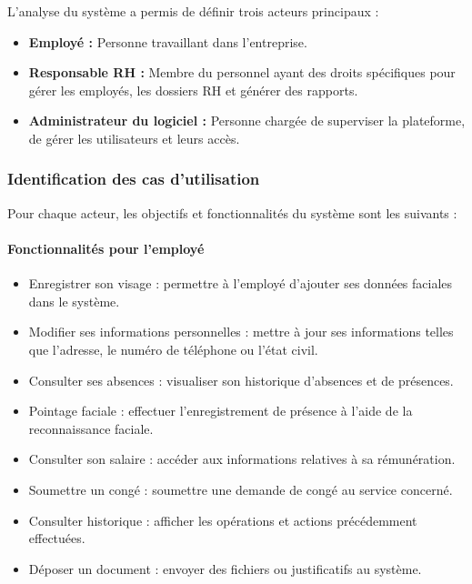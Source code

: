 L'analyse du système a permis de définir trois acteurs principaux :

\begin{itemize}
  \item \textbf{Employé :} Personne travaillant dans l'entreprise.
  \item \textbf{Responsable RH :} Membre du personnel ayant des droits spécifiques pour
        gérer les employés, les dossiers RH et générer des rapports.
  \item \textbf{Administrateur du logiciel :} Personne chargée de superviser la plateforme,
        de gérer les utilisateurs et leurs accès.
\end{itemize}

\subsubsection{Identification des cas d'utilisation}

Pour chaque acteur, les objectifs et fonctionnalités du système sont les suivants :

\paragraph{Fonctionnalités pour l'employé}

\begin{itemize}
  \item Enregistrer son visage : permettre à l'employé d'ajouter ses données faciales dans le système.
  \item Modifier ses informations personnelles : mettre à jour ses informations telles que l'adresse, le numéro de téléphone ou l'état civil.
  \item Consulter ses absences : visualiser son historique d'absences et de présences.
  \item Pointage faciale : effectuer l'enregistrement de présence à l'aide de la reconnaissance faciale.
  \item Consulter son salaire : accéder aux informations relatives à sa rémunération.
  \item Soumettre un  congé : soumettre une demande de congé au service concerné.
  \item Consulter historique : afficher les opérations et actions précédemment effectuées.
  \item Déposer un document : envoyer des fichiers ou justificatifs au système.
  
\end{itemize}


